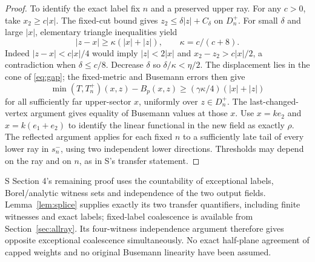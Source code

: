 \begin{proof}
To identify the exact label fix $n$ and a preserved upper ray. For any
$c>0$, take $x_2\ge c|x|$. The fixed-cut bound gives
$z_2\le\delta|z|+C_\delta$ on $D_n^+$. For small $\delta$ and large
$|x|$, elementary triangle inequalities yield
\[
 |z-x|\ge\kappa(|x|+|z|),\qquad \kappa=c/(c+8).
\]
Indeed $|z-x|<c|x|/4$ would imply $|z|<2|x|$ and
$x_2-z_2>c|x|/2$, a contradiction when $\delta\le c/8$.
Decrease $\delta$ so $\delta/\kappa<\eta/2$. The displacement lies in
the cone of \eqref{eq:gap}; the fixed-metric and Busemann errors then give
\[
 \min(T,T_n^+)(x,z)-B_p(x,z)
 \ge(\gamma\kappa/4)(|x|+|z|)
\]
for all sufficiently far upper-sector $x$, uniformly over $z\in D_n^+$.
The last-changed-vertex argument gives equality of Busemann values at those
$x$. Use $x=ke_2$ and $x=k(e_1+e_2)$ to identify the linear functional
in the new field as exactly $\rho$. The reflected argument applies for
each fixed $n$ to a sufficiently late tail of every lower ray in $s_n^-$,
using two independent lower directions. Thresholds may depend on the ray
and on $n$, as in S's transfer statement.
\end{proof}

S Section 4's remaining proof uses the countability of exceptional labels,
Borel/analytic witness sets and independence of the two output fields.
Lemma~\ref{lem:splice} supplies exactly its two transfer quantifiers,
including finite witnesses and exact labels; fixed-label coalescence is
available from Section~\ref{sec:allray}. Its four-witness independence
argument therefore gives opposite exceptional coalescence simultaneously.
No exact half-plane agreement of capped weights and no original Busemann
linearity have been assumed.
